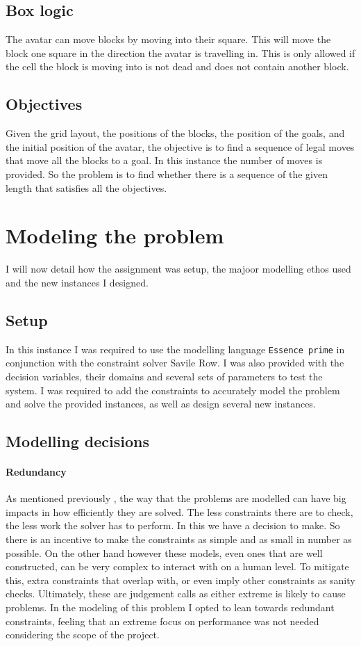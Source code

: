 \documentclass[british]{article}
\newcommand{\code}[1]{\texttt{#1}}
\begin{document}
\subsection{Box logic}
The avatar can move blocks by moving into their square. This will move the block one square in the direction the avatar is travelling in. This is only allowed if the cell the block is moving into is not dead and does not contain another block.

\subsection{Objectives}
Given the grid layout, the positions of the blocks, the position of the goals, and the initial position of the avatar, the objective is to find a sequence of legal moves that move all the blocks to a goal. In this instance the number of moves is provided. So the problem is to find whether there is a sequence of the given length that satisfies all the objectives. 


\section{Modeling the problem}
I will now detail how the assignment was setup, the majoor modelling ethos used and the new instances I designed. 
\label{model}
\subsection{Setup}
In this instance I was required to use the modelling language \code{Essence prime} in conjunction with the constraint solver Savile Row. I was also provided with the decision variables, their domains and several sets of parameters to test the system. I was required to add the constraints to accurately model the problem and solve the provided instances, as well as design several new instances. 

\subsection{Modelling decisions}
\paragraph{Redundancy}
As mentioned previously , the way that the problems are modelled can have big impacts in how efficiently they are solved. The less constraints there are to check, the less work the solver has to perform. In this we have a decision to make. So there is an incentive to make the constraints as simple and as small in number as possible. On the other hand however these models, even ones that are well constructed, can be very complex to interact with on a human level. To mitigate this, extra constraints that overlap with, or even imply other constraints as sanity checks. Ultimately, these are judgement calls as either extreme is likely to cause problems. In the modeling of this problem I opted to lean towards redundant constraints, feeling that an extreme focus on performance was not needed considering the scope of the project. 
\end{document}
